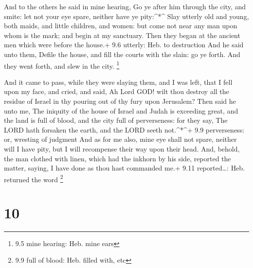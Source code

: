  And to the others he said in mine hearing, Go ye after him
through the city, and smite: let not your eye spare, neither have ye
pity:\^{}*\^{}  Slay utterly old and young, both maids, and
little children, and women: but come not near any man upon whom is the
mark; and begin at my sanctuary. Then they began at the ancient men
which were before the house.+ 9.6 utterly: Heb. to destruction
 And he said unto them, Defile the house, and fill the
courts with the slain: go ye forth. And they went forth, and slew in the
city. \footnote{9.5 mine hearing: Heb. mine ears}

 And it came to pass, while they were slaying them, and I
was left, that I fell upon my face, and cried, and said, Ah Lord GOD!
wilt thou destroy all the residue of Israel in thy pouring out of thy
fury upon Jerusalem?  Then said he unto me, The iniquity of
the house of Israel and Judah is exceeding great, and the land is full
of blood, and the city full of perverseness: for they say, The LORD hath
forsaken the earth, and the LORD seeth not.\^{}*\^{}+ 9.9 perverseness:
or, wresting of judgment  And as for me also, mine eye
shall not spare, neither will I have pity, but I will recompense their
way upon their head.  And, behold, the man clothed with
linen, which had the inkhorn by his side, reported the matter, saying, I
have done as thou hast commanded me.+ 9.11 reported\ldots: Heb. returned
the word \footnote{9.9 full of blood: Heb. filled with, etc}

\hypertarget{section-9}{%
\section{10}\label{section-9}}

